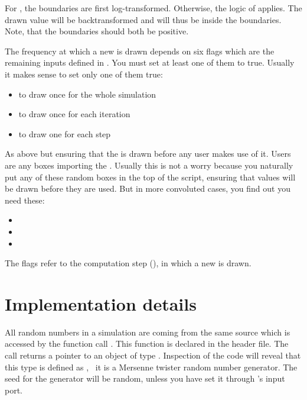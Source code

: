 For , the boundaries are first log-transformed. Otherwise, the logic of  applies. The drawn value will be  backtransformed and will thus be inside the boundaries. Note, that the boundaries should both be positive. 

The frequency at which a new  is drawn depends on six flags which are the remaining inputs defined in . You must set at least one of them to true. Usually it makes sense to set only one of them true:
\begin{itemize}
\item {} to draw once for the whole simulation
\item {} to draw once for each iteration
\item {} to draw one for each step
\end{itemize}
As above but ensuring that the  is drawn before any user makes use of it. Users are any boxes importing the . Usually this is not a worry because you naturally put any of these random boxes in the top of the script, ensuring that values will be drawn before they are used. But in more convoluted cases, you find out you need these:
\begin{itemize}
\item {} 
\item {}
\item {}
\end{itemize}
The flags refer to the computation step (), in which a new  is drawn.

\section{Implementation details}
All random numbers in a simulation are coming from the same source which is accessed by the function call . This function is declared in the  header file. The call returns a pointer to an object of type . Inspection of the code will reveal that this type is defined as , \ie\ it is a Mersenne twister random number generator. The seed for the generator will be random, unless you have set it through 's  input port.

